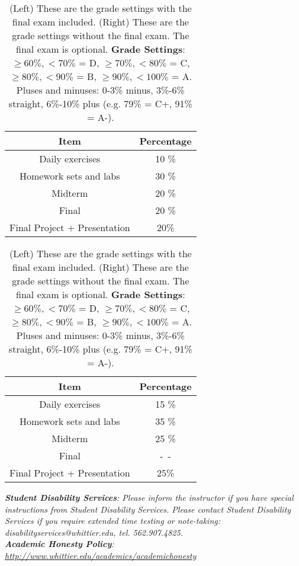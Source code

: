 \documentclass[10pt]{article}
\begin{document}
\begin{table}[h]
\centering
\begin{tabular}{| c | c |}
\hline
Item & Percentage \\ \hline \hline
Daily exercises & 10 \% \\ \hline
Homework sets and labs & 30 \% \\ \hline
Midterm & 20 \% \\ \hline
Final & 20 \% \\ \hline
Final Project + Presentation & 20\% \\ \hline
\end{tabular}
\begin{tabular}{| c | c |}
\hline
Item & Percentage \\ \hline \hline
Daily exercises & 15 \% \\ \hline
Homework sets and labs & 35 \% \\ \hline
Midterm & 25 \% \\ \hline
Final & -~- \\ \hline
Final Project + Presentation & 25\% \\ \hline
\end{tabular}
\caption{\label{tab:grades} (Left) These are the grade settings with the final exam included. (Right) These are the grade settings without the final exam.  The final exam is optional. \textbf{Grade Settings}: $\geq 60\%, <70\%$ = D, $\geq 70\%, <80\%$ = C, $\geq 80\%, <90\%$ = B, $\geq 90\%, <100\%$ = A. Pluses and minuses: 0-3\% minus, 3\%-6\% straight, 6\%-10\% plus (e.g. 79\% = C+, 91\% = A-).}
\end{table}
\noindent
\textit{\textbf{Student Disability Services}: Please inform the instructor if you have special instructions from Student Disability Services.  Please contact Student Disability Services if you require extended time testing or note-taking: disabilityservices@whittier.edu, tel. 562.907.4825.} \\
\textit{\textbf{Academic Honesty Policy}: \url{http://www.whittier.edu/academics/academichonesty}}
\noindent
\end{document}
